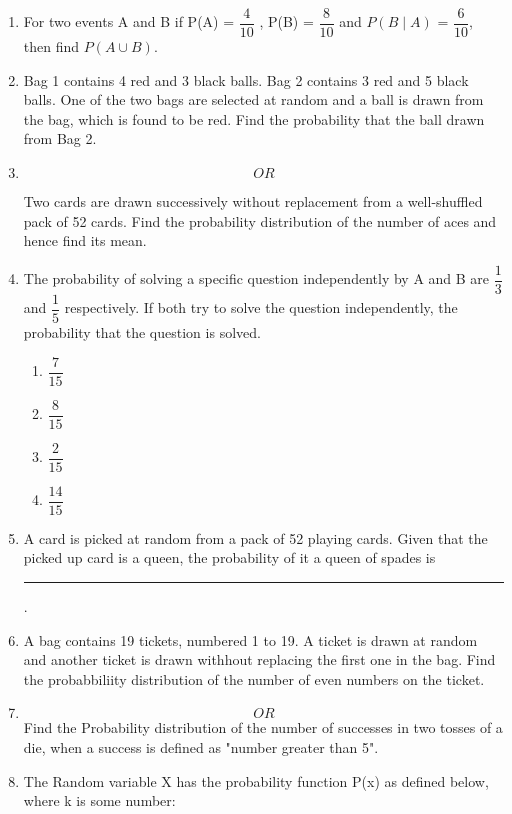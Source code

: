 \documentclass[a4paper,12pt]{article}
\begin{document}
\begin{enumerate}
\item For two events A and B if P(A) = $\dfrac{4}{10}$ , P(B) = $\dfrac{8}{10}$ and $P(B\mid A)$ = $\dfrac{6}{10}$, then find $P(A \cup B)$.

\item Bag 1 contains 4 red and 3 black balls. Bag 2 contains 3 red and 5 black balls. One of the two bags are  selected at random and a ball is drawn from the bag, which is found to be red. Find the probability that the ball drawn from Bag 2.
\item [ ]$$ OR $$

Two cards are drawn successively without replacement from a well-shuffled pack of 52 cards. Find the probability distribution of the number of aces and hence find its mean.

\item The probability of solving a specific question independently by A and B are $\dfrac{1}{3}$ and $\dfrac{1}{5}$ respectively. If both try to solve the question independently, the probability that the question is solved. 
\begin{enumerate}
\item $\dfrac{7}{15}$\\
\item $\dfrac{8}{15}$\\
\item $\dfrac{2}{15}$\\
\item $\dfrac{14}{15}$\\
\end{enumerate}

\item A card is picked at random from a pack of 52 playing cards. Given that the picked up card is a queen, the probability of it a queen of spades is \rule{2cm}{0.15mm}.

\item A bag contains 19 tickets, numbered 1 to 19. A ticket is drawn at random and another ticket is drawn withhout replacing the first one in the bag. Find the probabbiliity distribution of the number of even numbers on the ticket.
\item [ ]$$ OR $$
Find the Probability distribution of the number of successes in two tosses of a die, when a success is defined as "number greater than 5".

\item The Random variable X has the probability function P(x) as defined below, where k is some number:\\


\end{enumerate}
\end{document}

